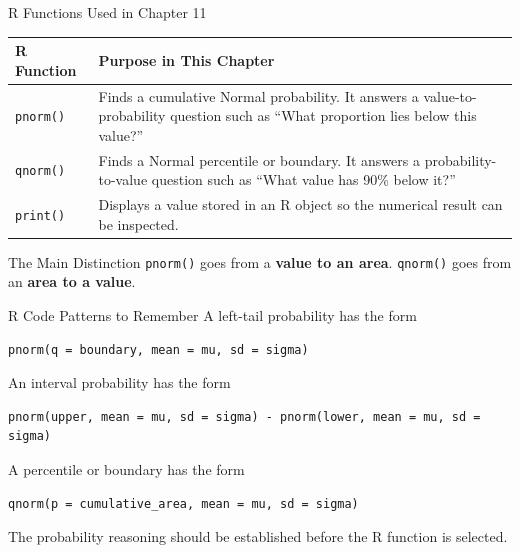 \documentclass[aspectratio=169]{beamer}
\begin{document}
\begin{frame}{R Functions Used in Chapter 11}
\begin{table}
  \centering
  \small
  \begin{tabularx}{\textwidth}{l X}
    \toprule
    \textbf{R Function} & \textbf{Purpose in This Chapter} \\
    \midrule
    \texttt{pnorm()} &
    Finds a cumulative Normal probability. It answers a value-to-probability question such as ``What proportion lies below this value?'' \\
    \texttt{qnorm()} &
    Finds a Normal percentile or boundary. It answers a probability-to-value question such as ``What value has 90\% below it?'' \\
    \texttt{print()} &
    Displays a value stored in an R object so the numerical result can be inspected. \\
    \bottomrule
  \end{tabularx}
\end{table}

\begin{block}{The Main Distinction}
\texttt{pnorm()} goes from a \textbf{value to an area}. \texttt{qnorm()} goes from an \textbf{area to a value}.
\end{block}
\end{frame}

\begin{frame}[fragile]{R Code Patterns to Remember}
A left-tail probability has the form
\begin{verbatim}
pnorm(q = boundary, mean = mu, sd = sigma)
\end{verbatim}

An interval probability has the form
\begin{verbatim}
pnorm(upper, mean = mu, sd = sigma) - pnorm(lower, mean = mu, sd = sigma)
\end{verbatim}

A percentile or boundary has the form
\begin{verbatim}
qnorm(p = cumulative_area, mean = mu, sd = sigma)
\end{verbatim}

The probability reasoning should be established before the R function is selected.
\end{frame}
\end{document}
